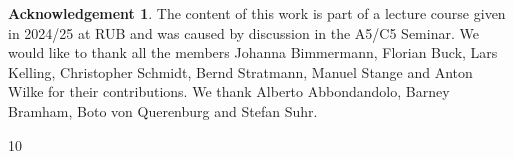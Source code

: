 \documentclass{amsart}
\theoremstyle{definition}
\newtheorem*{ack}{Acknowledgement}
\begin{document}


\begin{ack}
  The content of this work is part of a lecture course
  given in 2024/25 at RUB
  and was caused by discussion in the A5/C5 Seminar.
  We would like to thank all the members
  Johanna Bimmermann,
  Florian Buck,
  Lars Kelling,
  Christopher Schmidt,
  Bernd Stratmann,
  Manuel Stange
  and Anton Wilke
  for their contributions.
  We thank Alberto Abbondandolo,
  Barney Bramham,
  Boto von Querenburg and Stefan Suhr.
\end{ack}




\begin{thebibliography}{10}



\end{thebibliography}
\end{document}
